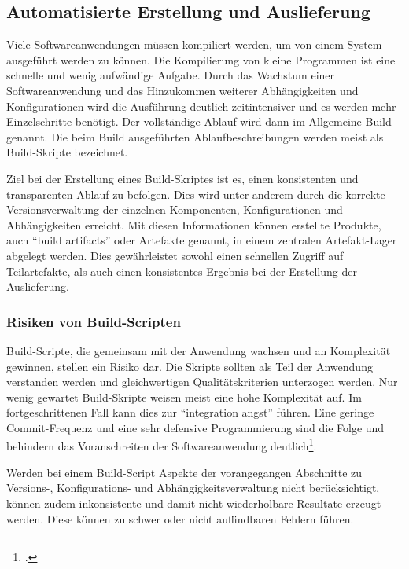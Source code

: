 \subsection{Automatisierte Erstellung und Auslieferung}

Viele Softwareanwendungen müssen kompiliert werden, um von einem System ausgeführt werden zu können. Die Kompilierung von kleine Programmen ist eine schnelle und wenig aufwändige Aufgabe. Durch das Wachstum einer Softwareanwendung und das Hinzukommen weiterer Abhängigkeiten und Konfigurationen wird die Ausführung deutlich zeitintensiver und es werden mehr Einzelschritte benötigt. Der vollständige Ablauf wird dann im Allgemeine Build genannt. Die beim Build ausgeführten Ablaufbeschreibungen werden meist als Build-Skripte bezeichnet. 

Ziel bei der Erstellung eines Build-Skriptes ist es, einen konsistenten und transparenten Ablauf zu 
befolgen. Dies wird unter anderem durch die korrekte Versionsverwaltung der einzelnen Komponenten, Konfigurationen und 
Abhängigkeiten erreicht. Mit diesen Informationen können erstellte Produkte, auch ``build artifacts'' oder Artefakte 
genannt, in einem zentralen Artefakt-Lager abgelegt werden. Dies gewährleistet sowohl einen schnellen Zugriff auf 
Teilartefakte, als auch einen konsistentes Ergebnis bei der Erstellung der Auslieferung.

\subsubsection{Risiken von Build-Scripten}

Build-Scripte, die gemeinsam mit der Anwendung wachsen und an Komplexität gewinnen, stellen ein Risiko dar. Die Skripte sollten als Teil der Anwendung verstanden werden und gleichwertigen Qualitätskriterien unterzogen werden. Nur wenig gewartet Build-Skripte weisen meist eine hohe Komplexität auf. Im fortgeschrittenen Fall kann dies zur  ``integration angst'' führen. Eine geringe Commit-Frequenz und eine sehr defensive Programmierung sind die Folge und behindern das Voranschreiten der Softwareanwendung deutlich\footcite[vgl.][]{ci-is-not-build-systems}.

Werden bei einem Build-Script Aspekte der vorangegangen Abschnitte zu Versions-, Konfigurations- und Abhängigkeitsverwaltung nicht berücksichtigt, können zudem inkonsistente und damit nicht 
wiederholbare Resultate erzeugt werden. Diese können zu schwer oder nicht auffindbaren Fehlern führen.

